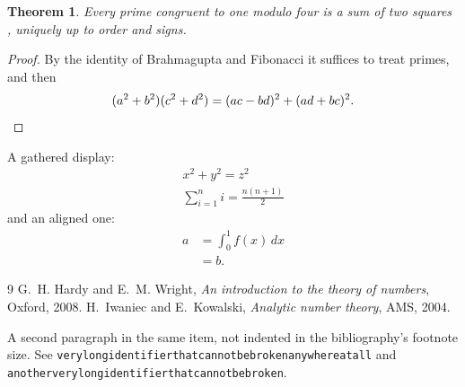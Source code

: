 \documentclass[11pt]{amsart}
\newtheorem{theorem}{Theorem}
\begin{document}
\begin{theorem}
Every prime congruent to one modulo four is a sum of two squares \cite{HW,IK}, uniquely up to order and signs.
\end{theorem}
\begin{proof}
By the identity of Brahmagupta and Fibonacci it suffices to treat primes, and then
\[
(a^2+b^2)(c^2+d^2) = (ac-bd)^2 + (ad+bc)^2. \qedhere
\]
\end{proof}
A gathered display:
\begin{gather*}
x^2+y^2=z^2 \\
\sum_{i=1}^n i=\frac{n(n+1)}{2}
\end{gather*}
and an aligned one:
\begin{align*}
a &= \int_0^1 f(x)\,dx \\
  &= b.
\end{align*}
\begin{thebibliography}{9}
 G.~H. Hardy and E.~M. Wright, \emph{An introduction to the theory of numbers}, Oxford, 2008.
 H.~Iwaniec and E.~Kowalski, \emph{Analytic number theory}, AMS, 2004.

A second paragraph in the same item, not indented in the bibliography's footnote size.
 See \texttt{verylongidentifierthatcannotbebrokenanywhereatall} and \texttt{anotherverylongidentifierthatcannotbebroken}.
\end{thebibliography}
\end{document}
